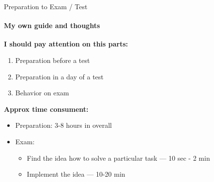 \documentclass[aspectratio=169,notes]{beamer}
\begin{document}
\begin{frame}[t]{Preparation to Exam / Test}
    \framesubtitle{My own guide and thoughts}
   \textbf{ I should pay attention on this parts:}
        \begin{enumerate}
            \item Preparation before a test
            \item Preparation in a day of a test
            \item Behavior on exam
        \end{enumerate}

      \textbf{Approx time consument:}
\begin{itemize}
    \item Preparation: 3-8 hours in overall
    \item Exam: \begin{itemize}
        \item Find the idea how to solve a particular task --- 10 sec - 2 min
        \item Implement the idea — 10-20 min
    \end{itemize}
\end{itemize}
    \end{frame}
    
\end{document}
